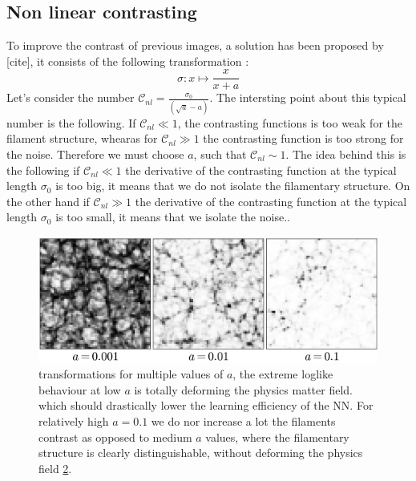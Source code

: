 \documentclass[11pt,a4paper]{report}
\begin{document}
\begin{multicols*}{2}
\begin{figure}[H]
        \caption{}
        \label{}
    \end{figure}



    \subsection{Non linear contrasting}
    To improve the contrast of previous images, a solution has been proposed by [cite], it consists of the following transformation :
    $$ \sigma : x \mapsto \frac{x}{x + a}$$
    Let's consider the number  $\mathcal{C}_{nl} = \frac{\sigma_0}{(\sqrt{a} - a)}$. The intersting point about this typical number is the following.
    If $\mathcal{C}_{nl} \ll 1 $, the contrasting functions is too weak for the filament structure, whearas for $\mathcal{C}_{nl} \gg 1$ the contrasting function is too strong for the noise. Therefore we must choose $a$, such that $\mathcal{C}_{nl} \sim 1$. The idea behind this is the following if $\mathcal{C}_{nl} \ll 1$ the derivative of the contrasting function at the typical length $\sigma_0$ is too big, it means that we do not isolate the filamentary structure. On the other hand if $\mathcal{C}_{nl} \gg 1$ the derivative of the contrasting function at the typical length $\sigma_0$ is too small, it means that we isolate the noise..
    \begin{figure}[H]
        \centering
        \includegraphics[width=0.99\linewidth]{./figure/img_transfo.png}
        \caption{transformations for multiple values of $a$, the extreme loglike behaviour at low $a$ is totally deforming the physics matter field. which should drastically lower the learning efficiency of the NN. For relatively high $a = 0.1$ we do nor increase a lot the filaments contrast as opposed to medium $a$ values, where the filamentary structure is clearly distinguishable, without deforming the physics field \ref{}.}
        \label{}
    \end{figure}


\end{multicols*}
\end{document}
